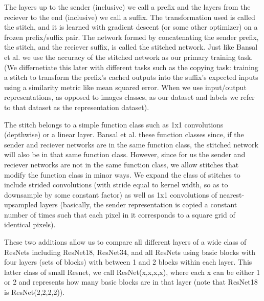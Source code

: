 \documentclass{article} %
\begin{document}
The layers up to the sender (inclusive) we call a prefix and the layers from the reciever to the end (inclusive) we call
a suffix. The transformation used is called the stitch, and it is learned with gradient descent (or some other optimizer)
on a frozen prefix/suffix pair. The network formed by concatenating the sender prefix, the stitch, and the reciever
suffix, is called the stitched network. Just like Bansal et al. we use the accuracy of the stitched network as our
primary training task. (We differnetiate this later with different tasks such as the copying task: training a stitch
to transform the prefix's cached outputs into the suffix's expected inputs using a similarity metric like mean squared
error. When we use input/output representations, as opposed to images classes, as our dataset and labels we refer to 
that dataset as the representation dataset).

The stitch belongs to a simple function class such as 1x1 convolutions (depthwise) or
a linear layer. Bansal et al. these function classes since, if the sender and reciever networks are in the same
function class, the stitched network will also be in that same function class. However, since for us the sender and
reciever networks are not in the same function class, we allow stitches that modify the function class in minor ways.
We expand the class of stitches to include strided convolutions (with stride equal to kernel width, so as to downsample
by some constant factor) as well as 1x1 convolutions of nearest-upsampled layers (basically, the sender representation
is copied a constant number of times such that each pixel in it corresponds to a square grid of identical pixels).

These two additions allow us to compare all different layers of a wide class of ResNets including ResNet18, ResNet34, and all
ResNets using basic blocks with four layers (sets of blocks) with between 1 and 2 blocks within each layer. This latter class
of small Resnet, we call ResNet(x,x,x,x), where each x can be either 1 or 2 and represents how many basic blocks are in that layer
(note that ResNet18 is ResNet(2,2,2,2)).
\end{document}
